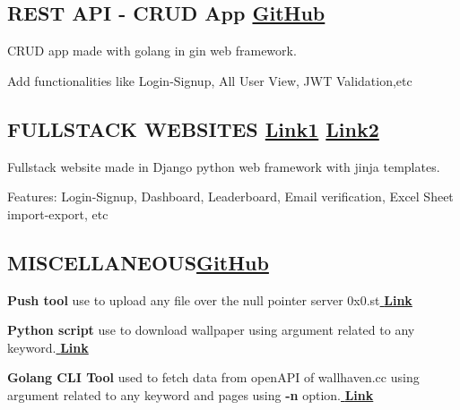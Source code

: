 \documentclass[a4paper,12pt]{article}
\begin{document}
\vspace*{4pt}
\subsection{{REST API - CRUD App }\hfill \href{https://github.com/lucifer1708/golang-REST-API-backend}{\textbf{GitHub}}} %
\begin{zitemize}
\item CRUD app made with golang in gin web framework.
\item Add functionalities like Login-Signup, All User View, JWT Validation,etc
\end{zitemize}



\vspace*{4pt}
\subsection{{ FULLSTACK WEBSITES }\hfill \href{https://github.com/istenith/cryptic-hunt}{\textbf{Link1}} \href{httphttps://github.com/lucifer1708/join.istenith.com}{\textbf{Link2}}}
\begin{zitemize}
\item Fullstack website made in Django python web framework with jinja templates. 
\item Features: Login-Signup, Dashboard, Leaderboard, Email verification, Excel Sheet import-export, etc
\end{zitemize}
\vspace*{4pt}
\subsection{{MISCELLANEOUS}\hfill \href{https://gist.github.com/lucifer1708}{\textbf{GitHub}}} 
\begin{zitemize}
  \item \textbf{Push tool} use to upload any file over the null pointer server 0x0.st\href{https://gist.github.com/lucifer1708/196a83a11efa5b1b17fd23a79dfb812e}{\textbf{ Link}}
  \item \textbf{Python script} use to download wallpaper using argument related to any keyword.\href{https://gist.github.com/lucifer1708/d46f4f91b1bff345aba25afc1e81f6d6}{\textbf{ Link}}
\item \textbf{Golang CLI Tool} used to fetch data from openAPI of wallhaven.cc using argument related to any keyword and pages using \textbf{-n} option.\href{https://github.com/lucifer1708/go-practice-apps.git}{\textbf{ Link}}
\end{zitemize}
\end{document}
